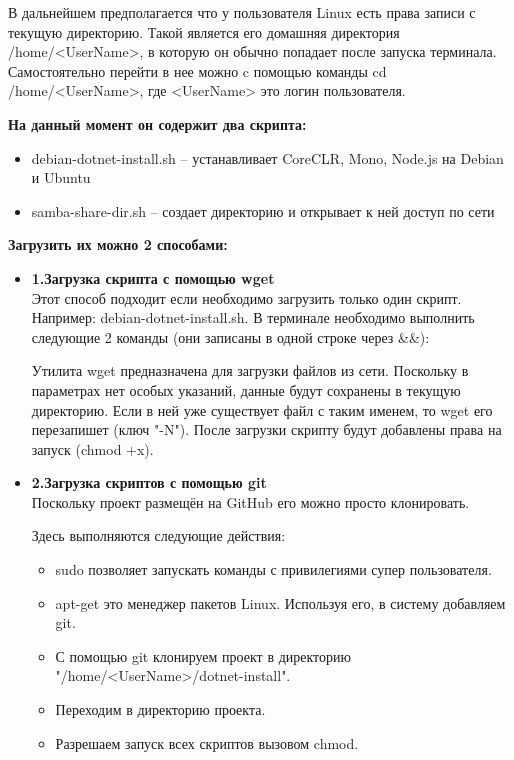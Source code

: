 \documentclass[12pt,a4paper,titlepage]{article}
\begin{document}
В дальнейшем предполагается что у пользователя Linux есть права записи с текущую директорию. Такой является его домашняя директория /home/<UserName>, в которую он обычно попадает после запуска терминала. Самостоятельно перейти в нее можно c помощью команды cd /home/<UserName>, где <UserName> это логин пользователя.

\textbf{На данный момент он содержит два скрипта:}
\begin{itemize}
\item debian-dotnet-install.sh – устанавливает CoreCLR, Mono, Node.js на Debian и Ubuntu
\item samba-share-dir.sh – создает директорию и открывает к ней доступ по сети
\end{itemize}

\textbf{Загрузить их можно 2 способами:}
\begin{itemize}
\item \textbf{1.Загрузка скрипта с помощью wget}\\
Этот способ подходит если необходимо загрузить только один скрипт. Например: debian-dotnet-install.sh. В терминале необходимо выполнить следующие 2 команды (они записаны в одной строке через \&\&):

Утилита wget предназначена для загрузки файлов из сети. Поскольку в параметрах нет особых указаний, данные будут сохранены в текущую директорию. Если в ней уже существует файл с таким именем, то wget его перезапишет (ключ "-N"). После загрузки скрипту будут добавлены права на запуск (chmod +x).

\item \textbf{2.Загрузка скриптов с помощью git}\\
Поскольку проект размещён на GitHub его можно просто клонировать.

Здесь выполняются следующие действия:
\begin{itemize}
\item sudo позволяет запускать команды с привилегиями супер пользователя.
\item apt-get это менеджер пакетов Linux. Используя его, в систему добавляем git.
\item С помощью git клонируем проект в директорию "/home/<UserName>/dotnet-install".
\item Переходим в директорию проекта.
\item Разрешаем запуск всех скриптов вызовом chmod.
\end{itemize}


\end{itemize}
\end{document}
